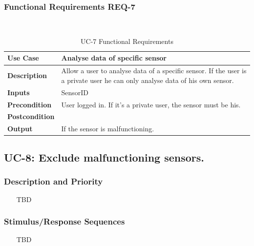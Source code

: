 \documentclass{report}
\begin{document}
\subsubsection*{Functional Requirements REQ-7} ~~~
\begin{table}[H]
	\begin{center}
		\begin{tabular}{|m{4cm}|m{10cm}|}
		\hline
		\textbf{Use Case} & Analyse data of specific sensor \\
		\hline
		\textbf{Description} & Allow a user to analyse data of a specific sensor. If the user is a private user he can only analyse data of his own sensor.  \\
		\hline
		\textbf{Inputs} &  SensorID\\
		\hline
		\textbf{Precondition} & User logged in. If it's a private user, the sensor must be his. \\
		\hline
		\textbf{Postcondition} &  \\
		\hline
		\textbf{Output} & If the sensor is malfunctioning. \\
		\hline
		\end{tabular}
	\end{center}
	\caption{UC-7 Functional Requirements}
	\label{table:REQ-7}
\end{table}

\subsection{UC-8: Exclude malfunctioning sensors.}

\subsubsection*{Description and Priority} ~~~
TBD

\subsubsection*{Stimulus/Response Sequences} ~~~
TBD
\end{document}
